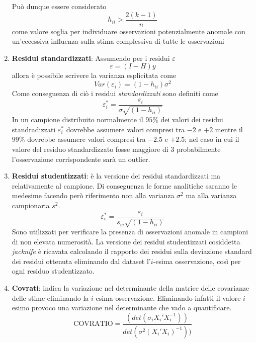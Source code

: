 \documentclass[a4page, 11pt]{article} %
\begin{document}
\begin{enumerate}
Può dunque essere considerato 
\begin{equation*}
h_{ii} > \frac{2(k-1)}{n}
\end{equation*}
come valore soglia per individuare osservazioni potenzialmente anomale con un'eccessiva influenza sulla stima complessiva di tutte le osservazioni 
\item \textbf{Residui standardizzati}: Assumendo per i residui $\varepsilon$
\begin{equation*}
\varepsilon = (I-H)y
\end{equation*}
allora è possibile scrivere la varianza esplicitata come
\begin{equation*}
Var(\varepsilon_i) = (1-h_{ii})\sigma^2
\end{equation*}
Come conseguenza di ciò i residui \textit{standardizzati} sono definiti come
\begin{equation*}
\varepsilon_i^* = \frac{\varepsilon_i}{\sigma \sqrt{(1-h_{ii})}}
\end{equation*}
In un campione distribuito normalmente il $95\%$ dei valori dei residui standradizzati $\varepsilon_i^*$ dovrebbe assumere valori compresi tra $-2$ e $+2$ mentre il $99\%$ dovrebbe assumere valori compresi tra $-2.5$ e $+2.5$; nel caso in cui il valore del residuo standardizzato fosse maggiore di $3$ probabilmente l’osservazione corrispondente sarà un outlier.
\item \textbf{Residui studentizzati}: è la versione dei residui standardizzati ma relativamente al campione.
Di conseguenza le forme analitiche saranno le medesime facendo però riferimento non alla varianza $\sigma^2$ ma alla varianza campionaria $s^2$.
\begin{equation*}
\varepsilon_i^* = \frac{\varepsilon_i}{s_{\varepsilon i} \sqrt{(1-h_{ii})}}
\end{equation*}
Sono utilizzati per verificare la presenza di osservazioni anomale in campioni di non elevata numerosità. La versione dei residui studentizzati cosiddetta \textit{jacknife} è ricavata calcolando il rapporto dei residui sulla deviazione standard dei residui ottenuta eliminando dal dataset l'$i$-esima osservazione, così per ogni residuo studentizzato.
\item \textbf{Covrati}: indica la variazione nel determinante della matrice delle covarianze delle stime eliminando la $i$-esima osservazione. Eliminando infatti il valore $i$-esimo provoco una variazione nel determinante che vado a quantificare.
\begin{equation*}
\mathrm{COVRATIO} = \frac{(det(\sigma_i X_i'X_i^{-1}))}{det(\sigma^2(X_i'X_i)^{-1}))}

\end{equation*}
\end{enumerate}
\end{document}
